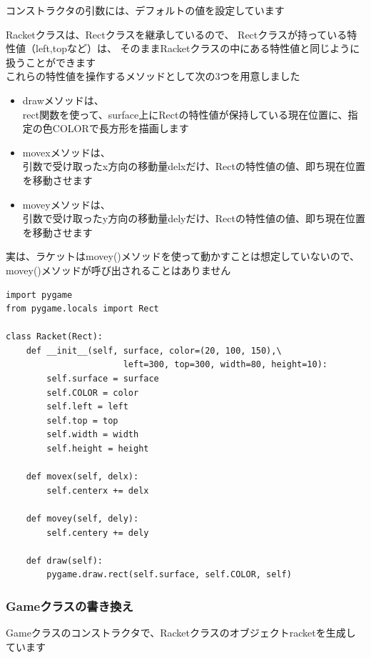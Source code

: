\documentclass[uplatex,a4paper,11pt,oneside,openany]{jsbook}
\begin{document}
コンストラクタの引数には、デフォルトの値を設定しています

Racketクラスは、Rectクラスを継承しているので、
Rectクラスが持っている特性値（left,topなど）は、
そのままRacketクラスの中にある特性値と同じように扱うことができます\\

これらの特性値を操作するメソッドとして次の3つを用意しました

\begin{itemize}
  \item drawメソッドは、\\rect関数を使って、surface上にRectの特性値が保持している現在位置に、指定の色COLORで長方形を描画します
  \item movexメソッドは、\\引数で受け取ったx方向の移動量delxだけ、Rectの特性値の値、即ち現在位置を移動させます
  \item moveyメソッドは、\\引数で受け取ったy方向の移動量delyだけ、Rectの特性値の値、即ち現在位置を移動させます
\end{itemize}

実は、ラケットはmovey()メソッドを使って動かすことは想定していないので、
movey()メソッドが呼び出されることはありません

\newpage

\begin{lstlisting}[caption=Racketクラス,label=p4]
import pygame
from pygame.locals import Rect

class Racket(Rect):
    def __init__(self, surface, color=(20, 100, 150),\
                       left=300, top=300, width=80, height=10):
        self.surface = surface
        self.COLOR = color
        self.left = left
        self.top = top
        self.width = width
        self.height = height

    def movex(self, delx):
        self.centerx += delx

    def movey(self, dely):
        self.centery += dely

    def draw(self):
        pygame.draw.rect(self.surface, self.COLOR, self)
\end{lstlisting}

\subsubsection{Gameクラスの書き換え}

Gameクラスのコンストラクタで、Racketクラスのオブジェクトracketを生成しています
\end{document}
